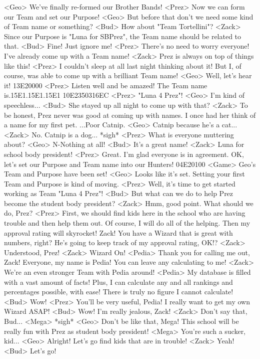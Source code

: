 <Geo> We've finally re-formed our Brother Bands! 
<Prez> Now we can form our Team and set our Purpose! 
<Geo> But before that don't we need some kind of Team name or something? 
<Bud> How about "Team Tortellini"? 
<Zack> Since our Purpose is "Luna for SBPrez", the 
Team name should be related to that. 
<Bud> Fine! Just ignore me! 
<Prez> There's no need to worry everyone! 
I've already come up with a Team name! 
<Zack> Prez is always on top of things like this! 
<Prez> I couldn't sleep at all last night thinking about it! 
But I, of course, was able to come up with a brilliant Team name! 
<Geo> Well, let's hear it! 
{13}{E2}{00}{00} 
<Prez> Listen well and be amazed! 
The Team name is.{15}{E1}.{15}{E1}.{15}{E1} 
{10}{E2}{35}{03}{16}{EC} 
<Prez> "Luna 4 Prez"! 
<Geo> I'm kind of speechless... 
<Bud> She stayed up all night to come up with that? 
<Zack> To be honest, Prez never was good at coming up with names. 
I once had her think of a name for my first pet. ...Poor Catnip. 
<Geo> Catnip because he's a cat... 
<Zack> No. 
Catnip is a dog... *sigh* 
<Prez> What is everyone muttering about? 
<Geo> N-Nothing at all! 
<Bud> It's a great name! 
<Zack> Luna for school body president! 
<Prez> Great. I'm glad everyone is in agreement. 
OK, let's set our Purpose and Team name into our Hunters! 
{04}{E2}{01}{00} 
<Game> Geo's Team and Purpose have been set! 
<Geo> Looks like it's set. 
Setting your first Team and Purpose is kind of moving. 
<Prez> Well, it's time to get started working as Team "Luna 4 Prez"! 
<Bud> But what can we do to help Prez become the student body president? 
<Zack> Hmm, good point. What should we do, Prez? 
<Prez> First, we should find kids here in the school who 
are having trouble and then help them out. 
Of course, I will do all of the helping. 
Then my approval rating will skyrocket! 
Zack! 
You have a Wizard that is great with numbers, right? 
He's going to keep track of my approval rating, OK!? 
<Zack> Understood, Prez! 
<Zack> Wizard On! 
<Pedia> Thank you for calling me out, Zack! 
Everyone, my name is Pedia! You can leave any calculating to me! 
<Zack> We're an even stronger Team with Pedia around! 
<Pedia> My database is filled with a vast amount of facts! 
Plus, I can calculate any and all rankings and 
percentages possible, with ease! 
There is truly no figure I cannot calculate! 
<Bud> Wow! 
<Prez> You'll be very useful, Pedia! 
I really want to get my own Wizard ASAP! 
<Bud> Wow! I'm really jealous, Zack! 
<Zack> Don't say that, Bud... 
<Mega> *sigh* 
<Geo> Don't be like that, Mega! 
This school will be really fun with Prez as student body president! 
<Mega> You're such a sucker, kid... 
<Geo> Alright! Let's go find kids that are in trouble! 
<Zack> Yeah! 
<Bud> Let's go! 
